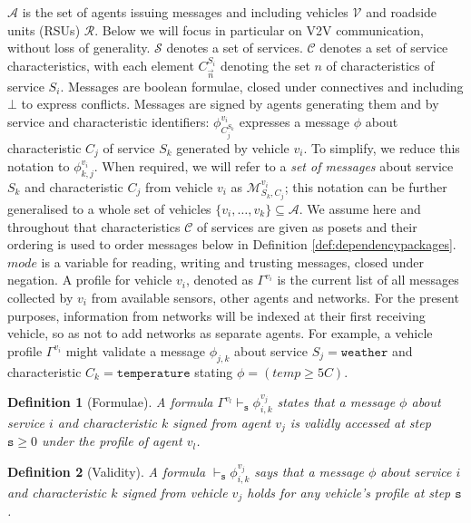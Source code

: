 \documentclass[compsoc, conference, letterpaper, 10pt, times]{IEEEtran}
\newtheorem{definition}{Definition}
\begin{document}
$\mathcal{A}$ is the set of agents issuing messages and including vehicles $\mathcal{V}$ and roadside units (RSUs) $\mathcal{R}$. Below we will focus in particular on V2V communication, without loss of generality. $\mathcal{S}$ denotes a set of services. $\mathcal{C}$ denotes a set of service characteristics, with each element $C^{S_i}_{\overrightarrow{n}}$ denoting the set $n$ of characteristics of service $S_{i}$. 
Messages are boolean formulae, closed under connectives and including $\bot$ to express conflicts. Messages are signed by agents generating them and by service and characteristic identifiers: $\phi^{v_{i}}_{C^{S_{k}}_{j}}$ expresses a  message $\phi$ about characteristic $C_j$ of service $S_k$  generated by vehicle $v_{i}$.  To simplify, we reduce this notation to $\phi^{v_{i}}_{k,j}$.  When required, we will refer to a \textit{set of messages} about service $S_{k}$ and characteristic $C_{j}$ from vehicle $v_{i}$ as $\mathcal{M}^{v_{i}}_{S_{k}, C_{j}}$; this notation can be further generalised to a whole set of vehicles $\{v_{i}, \dots, v_{k}\} \subseteq  \mathcal{A}$. We assume here and throughout that characteristics $\mathcal{C}$ of services are given as posets and their ordering is used to order messages below in Definition \ref{def:dependencypackages}.  $mode$ is a variable for reading, writing and trusting messages, closed under negation. A profile for vehicle $v_{i}$, denoted as $\Gamma^{v_{i}}$ is the current list of all messages collected by $v_{i}$ from available sensors, other agents and networks. For the present purposes, information from networks will be indexed at their first receiving vehicle, so as not to add networks as separate agents. For example, a vehicle profile $\Gamma^{v_{i}}$ might validate a message $\phi_{j,k}$ about service $S_{j}=\mathtt{weather}$ and characteristic $C_{k}=\mathtt{temperature}$ stating $\phi= (temp \geq 5C)$.


\begin{definition}[Formulae]
A formula $\Gamma^{v_l} \vdash_{\mathtt{s}} \phi^{v_{j}}_{i,k}$ states that a message $\phi$ about service $i$ and characteristic $k$ signed from agent $v_{j}$  is validly accessed at step $\mathtt{s}\geq 0$ under the profile of agent $v_{l}$.
\end{definition}

\begin{definition}[Validity]
A formula $\vdash_{\mathtt{s}} \phi^{v_{j}}_{i,k}$ says that a message $\phi$  about service $i$ and characteristic $k$ signed from vehicle $v_{j}$ holds for \textit{any} vehicle's profile at step $\mathtt{s}$.
\end{definition}
\end{document}
